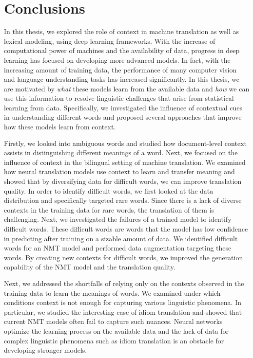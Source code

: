 
\chapter{Conclusions}
\label{chapter:conclusions}


In this thesis, we explored the role of context in machine translation as well as lexical modeling, using deep learning frameworks.
With the increase of computational power of machines and the availability of data, progress in deep learning has focused on developing more advanced models. 
In fact, with the increasing amount of training data, the performance of many computer vision and language understanding tasks has increased significantly. 
%
In this thesis, we are motivated by \textit{what} these models learn from the available data and \textit{how} we can use this information to resolve linguistic challenges that arise from statistical learning from data. 
Specifically, we investigated the influence of contextual cues in understanding different words and proposed several approaches that improve how these models learn from context.

Firstly, we looked into ambiguous words and studied how document-level context assists in distinguishing different meanings of a word. 
Next, we focused on the influence of context in the bilingual setting of machine translation. 
We examined how neural translation models use context to learn and transfer meaning and showed that by diversifying data for difficult words, we can improve translation quality.
In order to identify difficult words, we first looked at the data distribution and specifically targeted rare words.
Since there is a lack of diverse contexts in the training data for rare words, the translation of them is challenging.
Next, we investigated the failures of a trained model to identify difficult words.
These difficult words are words that the model has low confidence in predicting after training on a sizable amount of data.
We identified difficult words for an NMT model and performed data augmentation targeting these words. 
By creating new contexts for difficult words, we improved the generation capability of the NMT model and the translation quality.

Next, we addressed the shortfalls of relying only on the contexts observed in the training data to learn the meanings of words. 
We examined under which conditions context is not enough for capturing various linguistic phenomena. 
In particular, we studied the interesting case of idiom translation and showed that current NMT models often fail to capture such nuances.
Neural networks optimize the learning process on the available data and the lack of data for complex linguistic phenomena such as idiom translation is an obstacle for developing stronger models. 


